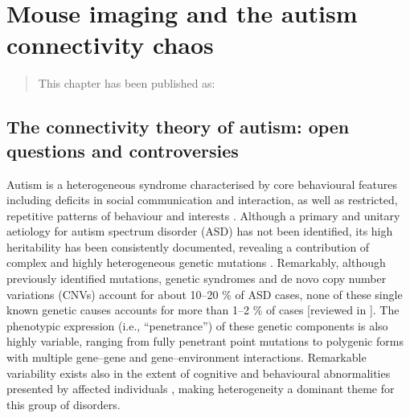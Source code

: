 \chapter{Mouse imaging and the autism connectivity chaos}

\label{Chapter04}

\begin{quote}
    This chapter has been published as:

\end{quote}

\section{The connectivity theory of autism: open questions and controversies}

Autism is a heterogeneous syndrome characterised by core behavioural features
including deficits in social communication and interaction, as well as
restricted, repetitive patterns of behaviour and interests
\parencite{association2013}.  Although a primary and unitary aetiology for
autism spectrum disorder (ASD) has not been identified, its high heritability
has been consistently documented, revealing a contribution of complex and highly
heterogeneous genetic mutations \parencite{geschwind2009, geschwind2015,
sanders2015}. Remarkably, although previously identified mutations, genetic
syndromes and de novo copy number variations (CNVs) account for about 10–20 \%
of ASD cases, none of these single known genetic causes accounts for more than
1–2 \% of cases [reviewed in \parencite{abrahams2008}]. The phenotypic
expression (i.e., “penetrance”) of these genetic components is also highly
variable, ranging from fully penetrant point mutations to polygenic forms with
multiple gene–gene and gene–environment interactions. Remarkable variability
exists also in the extent of cognitive and behavioural abnormalities presented
by affected individuals \parencite{lai2014, chang2015, georgiades2013}, making
heterogeneity a dominant theme for this group of disorders. 

